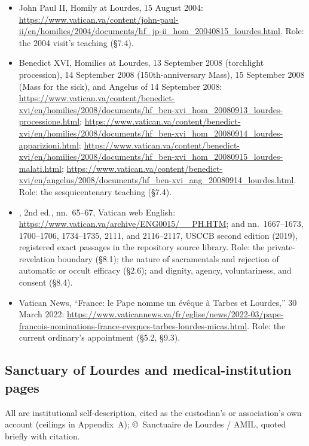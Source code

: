 \begin{itemize}
Message for the first World Day of the Sick, 21 October 1992
(English):
\url{https://www.vatican.va/content/john-paul-ii/en/messages/sick/documents/hf_jp-ii_mes_21101992_world-day-of-the-sick-1993.html}.
Role: the institution and purpose of the Day (\S7.2).
\item John Paul II, Homily at Lourdes, 15 August 2004:
\url{https://www.vatican.va/content/john-paul-ii/en/homilies/2004/documents/hf_jp-ii_hom_20040815_lourdes.html}.
Role: the 2004 visit's teaching (\S7.4).
\item Benedict XVI, Homilies at Lourdes, 13 September 2008
(torchlight procession), 14 September 2008 (150th-anniversary
Mass), 15 September 2008 (Mass for the sick), and Angelus of 14
September 2008:
\url{https://www.vatican.va/content/benedict-xvi/en/homilies/2008/documents/hf_ben-xvi_hom_20080913_lourdes-processione.html};
\url{https://www.vatican.va/content/benedict-xvi/en/homilies/2008/documents/hf_ben-xvi_hom_20080914_lourdes-apparizioni.html};
\url{https://www.vatican.va/content/benedict-xvi/en/homilies/2008/documents/hf_ben-xvi_hom_20080915_lourdes-malati.html};
\url{https://www.vatican.va/content/benedict-xvi/en/angelus/2008/documents/hf_ben-xvi_ang_20080914_lourdes.html}.
Role: the sesquicentenary teaching (\S7.4).
\item {}, 2nd ed.,
nn.~65--67, Vatican web English:
\url{https://www.vatican.va/archive/ENG0015/__PH.HTM}; and
nn.~1667--1673, 1700--1706, 1734--1735, 2111, and 2116--2117,
USCCB second edition (2019), registered exact passages in the
repository source library. Role: the private-revelation boundary
(\S8.1); the nature of sacramentals and rejection of automatic or
occult efficacy (\S2.6); and dignity, agency, voluntariness, and
consent (\S8.4).
\item Vatican News, ``France: le Pape nomme un \'ev\^eque \`a
Tarbes et Lourdes,'' 30 March 2022:
\url{https://www.vaticannews.va/fr/eglise/news/2022-03/pape-francois-nominations-france-eveques-tarbes-lourdes-micas.html}.
Role: the current ordinary's appointment (\S5.2, \S9.3).
\end{itemize}

\subsection*{Sanctuary of Lourdes and medical-institution pages}

All are institutional self-description, cited as the custodian's
or association's own account (ceilings in Appendix~A);
\copyright\ Sanctuaire de Lourdes / AMIL, quoted briefly with
citation.

